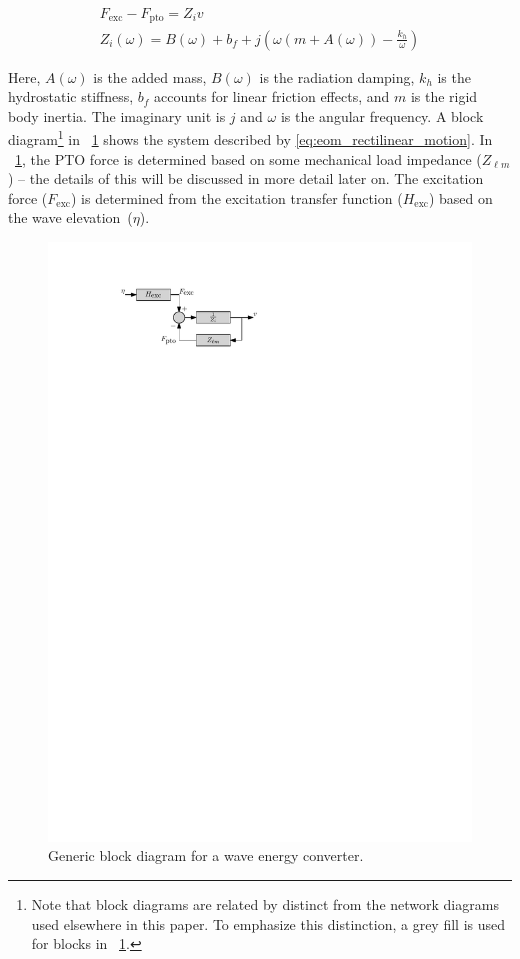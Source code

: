 \documentclass[lettersize,journal]{IEEEtran}
\begin{document}
\begin{subequations}
\begin{gather}
        F_{\textrm{exc}} - F_{\textrm{pto}} = Z_i v \label{eq:eom_rectilinear_motion} \\
        Z_i(\omega) = B(\omega) + b_f + j \left( \omega \left( m + A(\omega) \right) - \frac{k_{h}}{\omega}\right)
\end{gather}
\end{subequations}

\noindent{}\noindent{}Here, $A(\omega)$ is the added mass, $B(\omega)$ is the radiation damping, $k_h$ is the hydrostatic stiffness, $b_f$ accounts for linear friction effects, and $m$ is the rigid body inertia.
The imaginary unit is $j$ and $\omega$ is the angular frequency.
A block diagram\footnote{\label{fn:block_diagrams}Note that block diagrams are related by distinct from the network diagrams used elsewhere in this paper. To emphasize this distinction, a grey fill is used for blocks in \figurename~\ref{fig:wec_as_multiport_block_diagram}.} in \figurename~\ref{fig:wec_as_multiport_block_diagram} shows the system described by \eqref{eq:eom_rectilinear_motion}.
In \figurename~\ref{fig:wec_as_multiport_block_diagram}, the PTO force is determined based on some mechanical load impedance ($Z_{\ell m}$) -- the details of this will be discussed in more detail later on.
The excitation force ($F_{\textrm{exc}}$) is determined from the excitation transfer function ($H_{\textrm{exc}}$) based on the wave elevation~($\eta$).

\begin{figure}[tb]
        \centering
        \includegraphics[width=0.8\columnwidth]{wec_as_multiport_block_diagram.pdf}
        \caption{Generic block diagram for a wave energy converter.}
        \label{fig:wec_as_multiport_block_diagram}
\end{figure}
\end{document}
